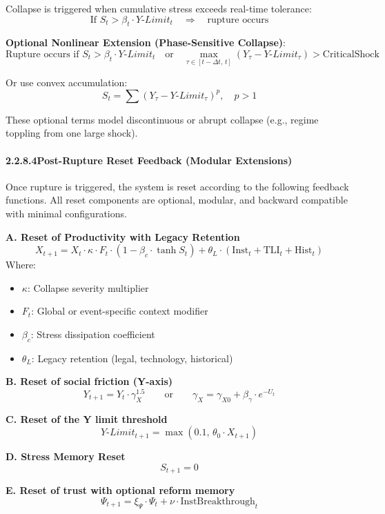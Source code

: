 \documentclass[12pt]{report}
\begin{document}
Collapse is triggered when cumulative stress exceeds real-time tolerance:
\[
\text{If } S_t > \beta_t \cdot Y\text{-}Limit_t \quad \Rightarrow \quad \text{rupture occurs}
\]

\textbf{Optional Nonlinear Extension (Phase-Sensitive Collapse)}:
\[
\text{Rupture occurs if } S_t > \beta_t \cdot Y\text{-}Limit_t \quad \text{or} \quad \max_{\tau \in [t-\Delta t,\, t]} \left(Y_\tau - Y\text{-}Limit_\tau\right) > \text{CriticalShock}
\]

Or use convex accumulation:
\[
S_t = \sum (Y_\tau - Y\text{-}Limit_\tau)^p, \quad p > 1
\]

These optional terms model discontinuous or abrupt collapse (e.g., regime toppling from one large shock).

\paragraph{2.2.8.4\quad Post-Rupture Reset Feedback (Modular Extensions)}

Once rupture is triggered, the system is reset according to the following feedback functions. All reset components are optional, modular, and backward compatible with minimal configurations.

\textbf{A. Reset of Productivity with Legacy Retention}
\[
X_{t+1} = X_t \cdot \kappa \cdot F_t \cdot \left(1 - \beta_c \cdot \tanh S_t \right) + \theta_L \cdot (\mathrm{Inst}_t + \mathrm{TLI}_t + \mathrm{Hist}_t)
\]
Where:
\begin{itemize}
  \item $\kappa$: Collapse severity multiplier
  \item $F_t$: Global or event-specific context modifier
  \item $\beta_c$: Stress dissipation coefficient
  \item $\theta_L$: Legacy retention (legal, technology, historical)
\end{itemize}

\textbf{B. Reset of social friction (Y-axis)}
\[
Y_{t+1} = Y_t \cdot \gamma_X^{1.5}
\qquad \text{or} \qquad 
\gamma_X = \gamma_{X0} + \beta_\gamma \cdot e^{-U_t}
\]

\textbf{C. Reset of the Y limit threshold}
\[
Y\text{-}Limit_{t+1} = \max(0.1,\, \theta_0 \cdot X_{t+1})
\]

\textbf{D. Stress Memory Reset}
\[
S_{t+1} = 0
\]

\textbf{E. Reset of trust with optional reform memory}
\[
\Psi_{t+1} = \xi_\Psi \cdot \Psi_t + \nu \cdot \mathrm{InstBreakthrough}_t
\]
\end{document}
